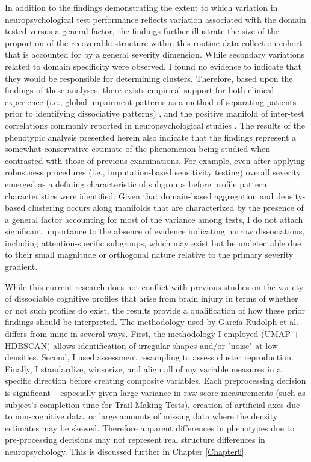 In addition to the findings demonstrating the extent to which variation in neuropsychological test performance reflects variation associated with the domain tested versus a general factor, the findings further illustrate the size of the proportion of the recoverable structure within this routine data collection cohort that is accounted for by a general severity dimension. While secondary variations related to domain specificity were observed, I found no evidence to indicate that they would be responsible for determining clusters. Therefore, based upon the findings of these analyses, there exists empirical support for both clinical experience (i.e., global impairment patterns as a method of separating patients prior to identifying dissociative patterns) \parencite{maas2017traumatic}, and the positive manifold of inter-test correlations commonly reported in neuropsychological studies \parencite{lezak2012neuropsychological}. The results of the phenotypic analysis presented herein also indicate that the findings represent a somewhat conservative estimate of the phenomenon being studied when contrasted with those of previous examinations. For example, even after applying robustness procedures (i.e., imputation-based sensitivity testing) overall severity emerged as a defining characteristic of subgroups before profile pattern characteristics were identified. Given that domain-based aggregation and density-based clustering occurs along manifolds that are characterized by the presence of a general factor accounting for most of the variance among tests, I do not attach significant importance to the absence of evidence indicating narrow dissociations, including attention-specific subgroups, which may exist but be undetectable due to their small magnitude or orthogonal nature relative to the primary severity gradient.

While this current research does not conflict with previous studies on the variety of dissociable cognitive profiles that arise from brain injury \parencite{garcia2020data} in terms of whether or not such profiles do exist, the results provide a qualification of how these prior findings should be interpreted. The methodology used by García-Rudolph et al. differs from mine in several ways. First, the methodology I employed (UMAP + HDBSCAN) allows identification of irregular shapes and/or "noise" at low densities. Second, I used assessment resampling to assess cluster reproduction. Finally, I standardize, winsorize, and align all of my variable measures in a specific direction before creating composite variables. Each preprocessing decision is significant -- especially given large variance in raw score measurements (such as subject's completion time for Trail Making Tests), creation of artificial axes due to non-cognitive data, or large amounts of missing data where the density estimates may be skewed. Therefore apparent differences in phenotypes due to pre-processing decisions may not represent real structure differences in neuropsychology. This is discussed further in Chapter \ref{Chapter6}.

